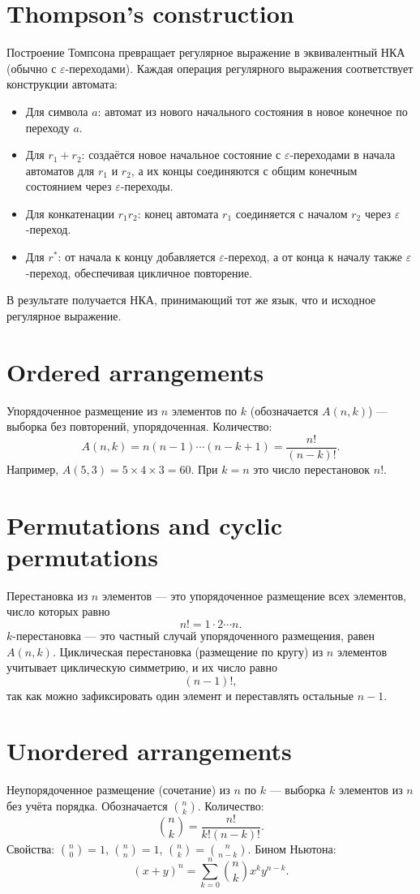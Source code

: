 \documentclass{article}
\begin{document}
\section{Thompson’s construction}
Построение Томпсона превращает регулярное выражение в эквивалентный НКА (обычно с $\varepsilon$-переходами). Каждая операция регулярного выражения соответствует конструкции автомата:
\begin{itemize}
	\item Для символа $a$: автомат из нового начального состояния в новое конечное по переходу $a$.
	\item Для $r_1 + r_2$: создаётся новое начальное состояние с $\varepsilon$-переходами в начала автоматов для $r_1$ и $r_2$, а их концы соединяются с общим конечным состоянием через $\varepsilon$-переходы.
	\item Для конкатенации $r_1 r_2$: конец автомата $r_1$ соединяется с началом $r_2$ через $\varepsilon$-переход.
	\item Для $r^*$: от начала к концу добавляется $\varepsilon$-переход, а от конца к началу также $\varepsilon$-переход, обеспечивая цикличное повторение.
\end{itemize}
В результате получается НКА, принимающий тот же язык, что и исходное регулярное выражение.

\section{Ordered arrangements}
Упорядоченное размещение из $n$ элементов по $k$ (обозначается $A(n,k)$) --- выборка без повторений, упорядоченная. Количество:
\[
A(n,k) = n(n-1)\cdots(n-k+1) = \frac{n!}{(n-k)!}.
\]
Например, $A(5,3) = 5\times4\times3 = 60$. При $k=n$ это число перестановок $n!$.

\section{Permutations and cyclic permutations}
Перестановка из $n$ элементов --- это упорядоченное размещение всех элементов, число которых равно
\[
n! = 1\cdot2\cdots n.
\]
$k$-перестановка --- это частный случай упорядоченного размещения, равен $A(n,k)$. Циклическая перестановка (размещение по кругу) из $n$ элементов учитывает циклическую симметрию, и их число равно
\[
(n-1)!,
\]
так как можно зафиксировать один элемент и переставлять остальные $n-1$.

\section{Unordered arrangements}
Неупорядоченное размещение (сочетание) из $n$ по $k$ --- выборка $k$ элементов из $n$ без учёта порядка. Обозначается $\displaystyle \binom{n}{k}$. Количество:
\[
\binom{n}{k} = \frac{n!}{k!(n-k)!}.
\]
Свойства: $\binom{n}{0}=1$, $\binom{n}{n}=1$, $\binom{n}{k} = \binom{n}{n-k}$. Бином Ньютона:
\[
(x+y)^n = \sum_{k=0}^n \binom{n}{k} x^k y^{n-k}.
\]
\end{document}

